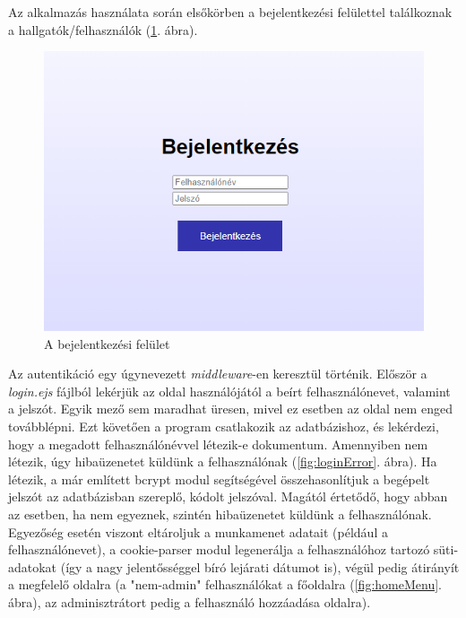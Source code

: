 Az alkalmazás használata során elsőkörben a bejelentkezési felülettel találkoznak a hallgatók/felhasználók (\ref{fig:login}. ábra). 

\begin{figure}[h]
	\centering
		\includegraphics[width=10truecm, height=7truecm]{images/bejelentkezes.png}
	\caption{A bejelentkezési felület}
	\label{fig:login}
\end{figure}

\newpage

Az autentikáció egy úgynevezett \textit{middleware}-en keresztül történik. Először a \textit{login.ejs} fájlból lekérjük az oldal használójától a beírt felhasználónevet, valamint a jelszót. Egyik mező sem maradhat üresen, mivel ez esetben az oldal nem enged továbblépni. Ezt követően a program csatlakozik az adatbázishoz, és lekérdezi, hogy a megadott felhasználónévvel létezik-e dokumentum. Amennyiben nem létezik, úgy hibaüzenetet küldünk a felhasználónak (\ref{fig:loginError}. ábra). Ha létezik, a már említett bcrypt modul segítségével összehasonlítjuk a begépelt jelszót az adatbázisban szereplő, kódolt jelszóval. Magától értetődő, hogy abban az esetben, ha nem egyeznek, szintén hibaüzenetet küldünk a felhasználónak. Egyezőség esetén viszont eltároljuk a munkamenet adatait (például a felhasználónevet), a cookie-parser modul legenerálja a felhasználóhoz tartozó süti-adatokat (így a nagy jelentősséggel bíró lejárati dátumot is), végül pedig átirányít a megfelelő oldalra (a "nem-admin" felhasználókat a főoldalra (\ref{fig:homeMenu}. ábra), az adminisztrátort pedig a felhasználó hozzáadása oldalra).

